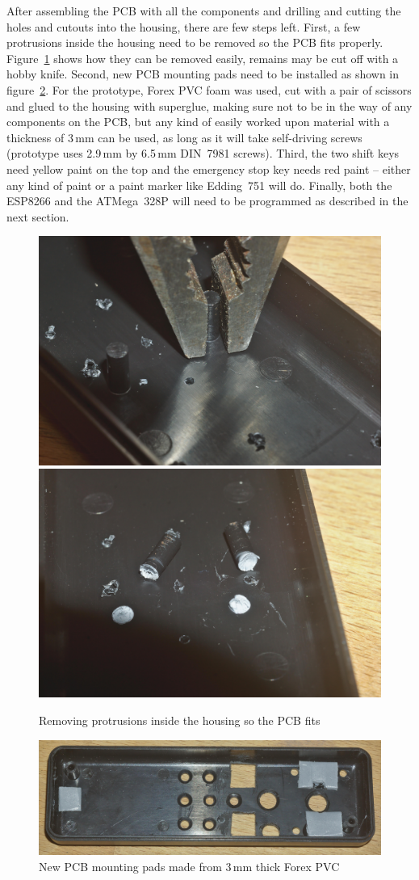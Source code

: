\documentclass[11pt,a4paper]{scrartcl}
\begin{document}
After assembling the PCB with all the components and drilling and cutting the holes and cutouts into the housing, there are few steps left. First, a few protrusions inside the housing need to be removed so the PCB fits properly. Figure~\ref{breakProtrusions} shows how they can be removed easily, remains may be cut off with a hobby knife. Second, new PCB mounting pads need to be installed as shown in figure~\ref{mountingPads}. For the prototype, Forex PVC foam was used, cut with a pair of scissors and glued to the housing with superglue, making sure not to be in the way of any components on the PCB, but any kind of easily worked upon material with a thickness of 3\,mm can be used, as long as it will take self-driving screws (prototype uses 2.9\,mm by 6.5\,mm DIN~7981 screws). Third, the two shift keys need yellow paint on the top and the emergency stop key needs red paint -- either any kind of paint or a paint marker like Edding~751 will do. Finally, both the ESP8266 and the ATMega~328P will need to be programmed as described in the next section.

\begin{figure}[tbh]
  \centering
  \includegraphics[width=0.49 \textwidth]{images/_DSC8654}
  \includegraphics[width=0.49 \textwidth]{images/_DSC8655}
  \caption{Removing protrusions inside the housing so the PCB fits}
  \label{breakProtrusions}
\end{figure}

\begin{figure}[tbh]
  \centering
  \includegraphics[width=0.8 \textwidth]{images/_DSC8658}
  \caption{New PCB mounting pads made from 3\,mm thick Forex PVC}
  \label{mountingPads}
\end{figure}
\end{document}
